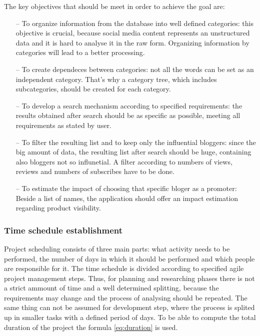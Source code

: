 The key objectives that should be meet in order to achieve the goal are:

\begin{itemize}

\item[--] To organize information from the database into well defined categories: this objective is crucial, because social media content represents an unstructured data and it is hard to analyse it in the raw form. Organizing information by categories will lead to a better processing.

\item[--] To create dependeces between categories: not all the words can be set as an independent category. That's why a category tree, which includes subcategories, should be created for each category.

\item[--] To develop a search mechanism according to specified requirements: the results obtained after search should be as specific as possible, meeting all requirements as stated by user.

\item[--] To filter the resulting list and to keep only the influential bloggers: since the big amount of data, the resulting list after search should be huge, containing also bloggers not so influnetial. A filter according to numbers of views, reviews and numbers of subscribes have to be done.

\item[--] To estimate the impact of choosing that specific bloger as a promoter: Beside a list of names, the application should offer an impact estimation regarding product visibility.

\end{itemize}

\subsubsection{Time schedule establishment}

Project scheduling consists of three main parts: what activity needs to be performed, the number of days in which it should be performed and which people are responsible for it. The time schedule is divided according to specified agile project management steps. Thus, for planning and researching phases there is not a strict ammount of time and a well determined splitting, because the requirements may change and the process of analysing should be repeated. The same thing can not be assumed for development step, where the process is splited up in smaller tasks with a defined period of days. To be able to compute the total duration of the project the formula \eqref{eq:duration} is used.

